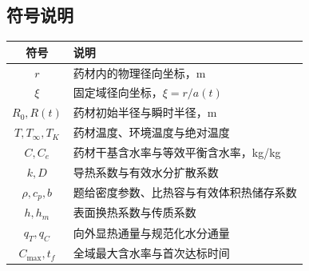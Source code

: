 \documentclass[withoutpreface,bwprint]{cumcmthesis}
\begin{document}
\subsection{符号说明}








\begin{table}[H]
	\centering
	
	\begin{tabularx}{\textwidth}{CL}
		\toprule
		符号    & 说明    \\
		\midrule
		$r$ & 药材内的物理径向坐标，m \\
		$\xi$ & 固定域径向坐标，$\xi=r/a(t)$ \\
		$R_0,R(t)$ & 药材初始半径与瞬时半径，m \\
		$T,T_\infty,T_K$ & 药材温度、环境温度与绝对温度 \\
		$C,C_e$ & 药材干基含水率与等效平衡含水率，kg/kg \\
		$k,D$ & 导热系数与有效水分扩散系数 \\
		$\rho,c_p,b$ & 题给密度参数、比热容与有效体积热储存系数 \\
		$h,h_m$ & 表面换热系数与传质系数 \\
		$q_T,q_C$ & 向外显热通量与规范化水分通量 \\
		$C_{\max},t_f$ & 全域最大含水率与首次达标时间 \\

		\bottomrule
	\end{tabularx}
	
	\label{tab:符号说明}
\end{table}












\begingroup
\let\outlineSubsection\subsection
\let\outlineSubsubsection\subsubsection
\renewcommand{\subsection}[1]{\outlineSubsection{#1}\mbox{}\par}
\renewcommand{\subsubsection}[1]{\outlineSubsubsection{#1}\mbox{}\par}
\end{document}
